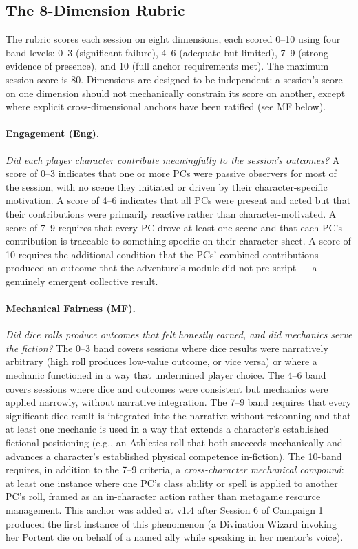 \subsection{The 8-Dimension Rubric}
\label{sec:rubric-dimensions}

The rubric scores each session on eight dimensions, each scored 0--10 using four band
levels: 0--3 (significant failure), 4--6 (adequate but limited), 7--9 (strong
evidence of presence), and 10 (full anchor requirements met). The maximum session score
is 80. Dimensions are designed to be independent: a session's score on one dimension
should not mechanically constrain its score on another, except where explicit
cross-dimensional anchors have been ratified (see MF below).

\paragraph{Engagement (Eng).}
\textit{Did each player character contribute meaningfully to the session's outcomes?}
A score of 0--3 indicates that one or more PCs were passive observers for most of the
session, with no scene they initiated or driven by their character-specific motivation.
A score of 4--6 indicates that all PCs were present and acted but that their
contributions were primarily reactive rather than character-motivated. A score of 7--9
requires that every PC drove at least one scene and that each PC's contribution is
traceable to something specific on their character sheet. A score of 10 requires the
additional condition that the PCs' combined contributions produced an outcome that the
adventure's module did not pre-script --- a genuinely emergent collective result.

\paragraph{Mechanical Fairness (MF).}
\textit{Did dice rolls produce outcomes that felt honestly earned, and did mechanics
serve the fiction?}
The 0--3 band covers sessions where dice results were narratively arbitrary (high roll
produces low-value outcome, or vice versa) or where a mechanic functioned in a way
that undermined player choice. The 4--6 band covers sessions where dice and outcomes
were consistent but mechanics were applied narrowly, without narrative integration.
The 7--9 band requires that every significant dice result is integrated into the
narrative without retconning and that at least one mechanic is used in a way that
extends a character's established fictional positioning (e.g., an Athletics roll that
both succeeds mechanically and advances a character's established physical competence
in-fiction). The 10-band requires, in addition to the 7--9 criteria, a
\textit{cross-character mechanical compound}: at least one instance where one PC's
class ability or spell is applied to another PC's roll, framed as an in-character
action rather than metagame resource management. This anchor was added at v1.4 after
Session 6 of Campaign 1 produced the first instance of this phenomenon (a Divination
Wizard invoking her Portent die on behalf of a named ally while speaking in her
mentor's voice).

